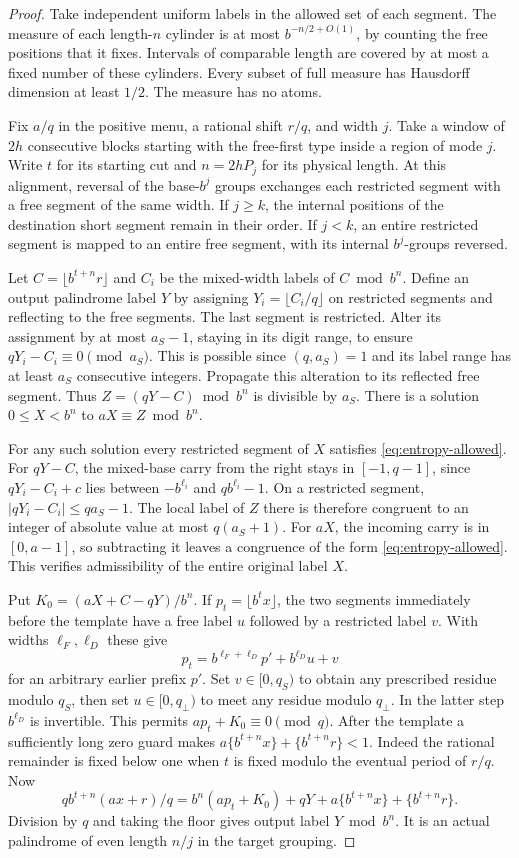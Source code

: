 \begin{proof}
Take independent uniform labels in the allowed set of each segment. The measure of each length-\(n\) cylinder is at most \(b^{-n/2+O(1)}\), by counting the free positions that it fixes. Intervals of comparable length are covered by at most a fixed number of these cylinders. Every subset of full measure has Hausdorff dimension at least \(1/2\). The measure has no atoms.

Fix \(a/q\) in the positive menu, a rational shift \(r/q\), and width \(j\). Take a window of \(2h\) consecutive blocks starting with the free-first type inside a region of mode \(j\). Write \(t\) for its starting cut and \(n=2hP_j\) for its physical length. At this alignment, reversal of the base-\(b^j\) groups exchanges each restricted segment with a free segment of the same width. If \(j\ge k\), the internal positions of the destination short segment remain in their order. If \(j<k\), an entire restricted segment is mapped to an entire free segment, with its internal \(b^j\)-groups reversed.

Let \(C=\lfloor b^{t+n}r\rfloor\) and \(C_i\) be the mixed-width labels of \(C\bmod b^n\). Define an output palindrome label \(Y\) by assigning \(Y_i=\lfloor C_i/q\rfloor\) on restricted segments and reflecting to the free segments. The last segment is restricted. Alter its assignment by at most \(a_S-1\), staying in its digit range, to ensure \(qY_i-C_i\equiv0\pmod{a_S}\). This is possible since \((q,a_S)=1\) and its label range has at least \(a_S\) consecutive integers. Propagate this alteration to its reflected free segment. Thus \(Z=(qY-C)\bmod b^n\) is divisible by \(a_S\). There is a solution \(0\le X<b^n\) to \(aX\equiv Z\bmod b^n\).

For any such solution every restricted segment of \(X\) satisfies \eqref{eq:entropy-allowed}. For \(qY-C\), the mixed-base carry from the right stays in \([-1,q-1]\), since \(qY_i-C_i+c\) lies between \(-b^{\ell_i}\) and \(qb^{\ell_i}-1\). On a restricted segment, \(|qY_i-C_i|\le qa_S-1\). The local label of \(Z\) there is therefore congruent to an integer of absolute value at most \(q(a_S+1)\). For \(aX\), the incoming carry is in \([0,a-1]\), so subtracting it leaves a congruence of the form \eqref{eq:entropy-allowed}. This verifies admissibility of the entire original label \(X\).

Put \(K_0=(aX+C-qY)/b^n\). If \(p_t=\lfloor b^t x\rfloor\), the two segments immediately before the template have a free label \(u\) followed by a restricted label \(v\). With widths \(\ell_F,\ell_D\) these give
\[
      p_t=b^{\ell_F+\ell_D}p'+b^{\ell_D}u+v
\]
for an arbitrary earlier prefix \(p'\). Set \(v\in[0,q_S)\) to obtain any prescribed residue modulo \(q_S\), then set \(u\in[0,q_\perp)\) to meet any residue modulo \(q_\perp\). In the latter step \(b^{\ell_D}\) is invertible. This permits \(ap_t+K_0\equiv0\pmod q\). After the template a sufficiently long zero guard makes \(a\{b^{t+n}x\}+\{b^{t+n}r\}<1\). Indeed the rational remainder is fixed below one when \(t\) is fixed modulo the eventual period of \(r/q\). Now
\[
 q b^{t+n}(ax+r)/q=b^n(ap_t+K_0)+qY+a\{b^{t+n}x\}+\{b^{t+n}r\}.
\]
Division by \(q\) and taking the floor gives output label \(Y\bmod b^n\). It is an actual palindrome of even length \(n/j\) in the target grouping.


\end{proof}
